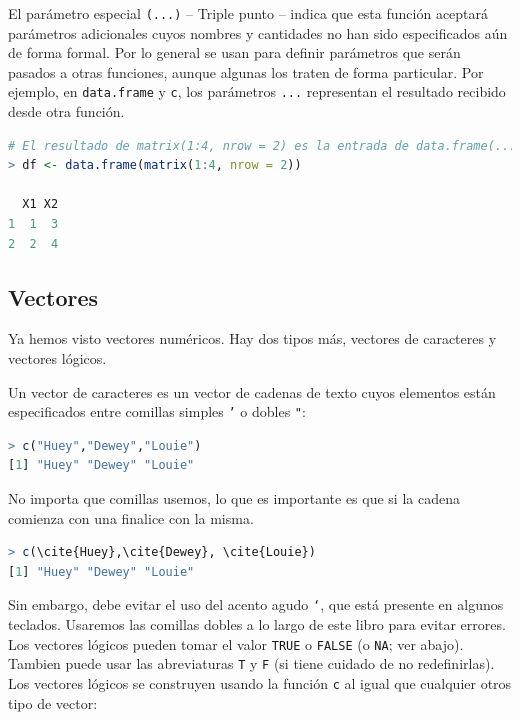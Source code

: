 El parámetro especial \texttt{(...)} -- Triple punto -- indica que esta función
aceptará parámetros adicionales cuyos nombres y cantidades no han sido
especificados aún de forma formal. Por lo general se usan para definir
parámetros que serán pasados a otras funciones, aunque algunas los traten de
forma particular.  Por ejemplo, en \texttt{data.frame} y \texttt{c}, los
parámetros \texttt{...} representan el resultado recibido desde otra función.

\begin{lstlisting}[language=R]
# El resultado de matrix(1:4, nrow = 2) es la entrada de data.frame(...)
> df <- data.frame(matrix(1:4, nrow = 2))

  X1 X2
1  1  3
2  2  4
\end{lstlisting}

\subsection{Vectores} \label{vectores}

Ya hemos visto vectores numéricos. Hay dos tipos más, vectores de caracteres y
vectores lógicos.

Un vector de caracteres es un vector de cadenas de texto cuyos elementos están
especificados entre comillas simples \texttt{'} o dobles \texttt{"}:

\begin{lstlisting}[language=R]
> c("Huey","Dewey","Louie")
[1] "Huey" "Dewey" "Louie"
\end{lstlisting}

No importa que comillas usemos, lo que es importante es que si la cadena
comienza con una finalice con la misma.

\begin{lstlisting}[language=R]
> c(\cite{Huey},\cite{Dewey}, \cite{Louie})
[1] "Huey" "Dewey" "Louie"
\end{lstlisting}

Sin embargo, debe evitar el uso del acento agudo \texttt{`}, que está presente
en algunos teclados. Usaremos las comillas dobles a lo largo de este libro para
evitar errores. Los vectores lógicos pueden tomar el valor \texttt{TRUE} o
\texttt{FALSE} (o \texttt{NA}; ver abajo). Tambien puede usar las abreviaturas
\texttt{T} y \texttt{F} (si tiene cuidado de no redefinirlas). Los vectores
lógicos se construyen usando la función \texttt{c} al igual que cualquier otros
tipo de vector:

